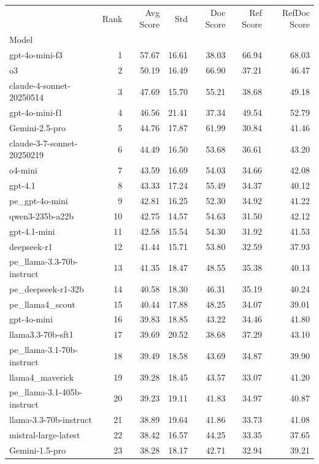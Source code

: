 \begin{tabular}{lrrrrrr}
\toprule
 & Rank & Avg Score & Std & Doc Score & Ref Score & RefDoc Score \\
Model &  &  &  &  &  &  \\
\midrule
gpt-4o-mini-f3 & 1 & 57.67 & 16.61 & 38.03 & 66.94 & 68.03 \\
o3 & 2 & 50.19 & 16.49 & 66.90 & 37.21 & 46.47 \\
claude-4-sonnet-20250514 & 3 & 47.69 & 15.70 & 55.21 & 38.68 & 49.18 \\
gpt-4o-mini-f1 & 4 & 46.56 & 21.41 & 37.34 & 49.54 & 52.79 \\
Gemini-2.5-pro & 5 & 44.76 & 17.87 & 61.99 & 30.84 & 41.46 \\
claude-3-7-sonnet-20250219 & 6 & 44.49 & 16.50 & 53.68 & 36.61 & 43.20 \\
o4-mini & 7 & 43.59 & 16.69 & 54.03 & 34.66 & 42.08 \\
gpt-4.1 & 8 & 43.33 & 17.24 & 55.49 & 34.37 & 40.12 \\
pe_gpt-4o-mini & 9 & 42.81 & 16.25 & 52.30 & 34.92 & 41.22 \\
qwen3-235b-a22b & 10 & 42.75 & 14.57 & 54.63 & 31.50 & 42.12 \\
gpt-4.1-mini & 11 & 42.58 & 15.54 & 54.30 & 31.92 & 41.53 \\
deepseek-r1 & 12 & 41.44 & 15.71 & 53.80 & 32.59 & 37.93 \\
pe_llama-3.3-70b-instruct & 13 & 41.35 & 18.47 & 48.55 & 35.38 & 40.13 \\
pe_deepseek-r1-32b & 14 & 40.58 & 18.30 & 46.31 & 35.19 & 40.24 \\
pe_llama4_scout & 15 & 40.44 & 17.88 & 48.25 & 34.07 & 39.01 \\
gpt-4o-mini & 16 & 39.83 & 18.85 & 43.22 & 34.46 & 41.80 \\
llama3.3-70b-sft1 & 17 & 39.69 & 20.52 & 38.68 & 37.29 & 43.10 \\
pe_llama-3.1-70b-instruct & 18 & 39.49 & 18.58 & 43.69 & 34.87 & 39.90 \\
llama4_maverick & 19 & 39.28 & 18.45 & 43.57 & 33.07 & 41.20 \\
pe_llama-3.1-405b-instruct & 20 & 39.23 & 19.11 & 41.83 & 34.97 & 40.87 \\
llama-3.3-70b-instruct & 21 & 38.89 & 19.64 & 41.86 & 33.73 & 41.08 \\
mistral-large-latest & 22 & 38.42 & 16.57 & 44.25 & 33.35 & 37.65 \\
Gemini-1.5-pro & 23 & 38.28 & 18.17 & 42.71 & 32.94 & 39.21 \\

\end{tabular}
